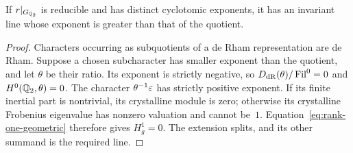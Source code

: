 \begin{lemma}\label{lem:higher-line}
If $r|_{G_{\mathbb Q_2}}$ is reducible and has distinct cyclotomic exponents,
it has an invariant line whose exponent is greater than that of the
quotient.
\end{lemma}
\begin{proof}
Characters occurring as subquotients of a de Rham representation are
de Rham.  Suppose a chosen subcharacter has smaller exponent than the
quotient, and let $\theta$ be their ratio.  Its exponent is strictly
negative, so $D_{\mathrm{dR}}(\theta)/\operatorname{Fil}^0=0$ and
$H^0(\mathbb Q_2,\theta)=0$.  The character $\theta^{-1}\varepsilon$ has strictly
positive exponent.  If its finite inertial part is nontrivial, its
crystalline module is zero; otherwise its crystalline Frobenius
eigenvalue has nonzero valuation and cannot be~$1$.
Equation~\eqref{eq:rank-one-geometric} therefore gives $H^1_g=0$.
The extension splits, and its other summand is the required line.
\end{proof}

